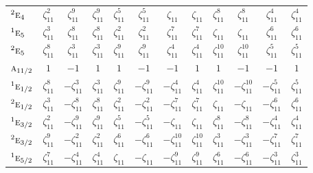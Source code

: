 \documentclass[10pt,a4paper]{article}
\makeatletter
\def\grouprule#1#2{\noalign{\marks\LTgroupmarks{\the\belowrulesep}\nobreak\vskip#1%
  \vskip\aboverulesep}\multispan\LT@cols\unskip{\leaders\hrule\@height#2\hfill\kern\z@}\cr
  \noalign{\penalty\LTrulebreak\vskip\belowrulesep\global\@lastruleclass\z@}}
\numberwithin{equation}{section}
\newcommand{\irr}[1]{\text{\normalfont\scshape #1}}
\newcommand{\conjpair}[1]{{}^{#1}}
\newcommand{\rootunity}[1]{\zeta_{#1}}
\makeatother
\begin{document}
{\begin{longtable}{@{}lccccccccccc@{}}
$\conjpair{2}\irr{e}_{4}$ & $\rootunity{11}^{2}$ & $\rootunity{11}^{9}$ & $\rootunity{11}^{9}$ & $\rootunity{11}^{5}$ & $\rootunity{11}^{5}$ & $\rootunity{11}$ & $\rootunity{11}$ & $\rootunity{11}^{8}$ & $\rootunity{11}^{8}$ & $\rootunity{11}^{4}$ & $\rootunity{11}^{4}$\\
$\conjpair{1}\irr{e}_{5}$ & $\rootunity{11}^{3}$ & $\rootunity{11}^{8}$ & $\rootunity{11}^{8}$ & $\rootunity{11}^{2}$ & $\rootunity{11}^{2}$ & $\rootunity{11}^{7}$ & $\rootunity{11}^{7}$ & $\rootunity{11}$ & $\rootunity{11}$ & $\rootunity{11}^{6}$ & $\rootunity{11}^{6}$\\
$\conjpair{2}\irr{e}_{5}$ & $\rootunity{11}^{8}$ & $\rootunity{11}^{3}$ & $\rootunity{11}^{3}$ & $\rootunity{11}^{9}$ & $\rootunity{11}^{9}$ & $\rootunity{11}^{4}$ & $\rootunity{11}^{4}$ & $\rootunity{11}^{10}$ & $\rootunity{11}^{10}$ & $\rootunity{11}^{5}$ & $\rootunity{11}^{5}$\\
\grouprule{0pt}{\lightrulewidth}
$\irr{a}_{11/2}$ & $1$ & $-1$ & $1$ & $1$ & $-1$ & $-1$ & $1$ & $1$ & $-1$ & $-1$ & $1$\\
$\conjpair{1}\irr{e}_{1/2}$ & $\rootunity{11}^{8}$ & $-\rootunity{11}^{3}$ & $\rootunity{11}^{3}$ & $\rootunity{11}^{9}$ & $-\rootunity{11}^{9}$ & $-\rootunity{11}^{4}$ & $\rootunity{11}^{4}$ & $\rootunity{11}^{10}$ & $-\rootunity{11}^{10}$ & $-\rootunity{11}^{5}$ & $\rootunity{11}^{5}$\\
$\conjpair{2}\irr{e}_{1/2}$ & $\rootunity{11}^{3}$ & $-\rootunity{11}^{8}$ & $\rootunity{11}^{8}$ & $\rootunity{11}^{2}$ & $-\rootunity{11}^{2}$ & $-\rootunity{11}^{7}$ & $\rootunity{11}^{7}$ & $\rootunity{11}$ & $-\rootunity{11}$ & $-\rootunity{11}^{6}$ & $\rootunity{11}^{6}$\\
$\conjpair{1}\irr{e}_{3/2}$ & $\rootunity{11}^{2}$ & $-\rootunity{11}^{9}$ & $\rootunity{11}^{9}$ & $\rootunity{11}^{5}$ & $-\rootunity{11}^{5}$ & $-\rootunity{11}$ & $\rootunity{11}$ & $\rootunity{11}^{8}$ & $-\rootunity{11}^{8}$ & $-\rootunity{11}^{4}$ & $\rootunity{11}^{4}$\\
$\conjpair{2}\irr{e}_{3/2}$ & $\rootunity{11}^{9}$ & $-\rootunity{11}^{2}$ & $\rootunity{11}^{2}$ & $\rootunity{11}^{6}$ & $-\rootunity{11}^{6}$ & $-\rootunity{11}^{10}$ & $\rootunity{11}^{10}$ & $\rootunity{11}^{3}$ & $-\rootunity{11}^{3}$ & $-\rootunity{11}^{7}$ & $\rootunity{11}^{7}$\\
$\conjpair{1}\irr{e}_{5/2}$ & $\rootunity{11}^{7}$ & $-\rootunity{11}^{4}$ & $\rootunity{11}^{4}$ & $\rootunity{11}$ & $-\rootunity{11}$ & $-\rootunity{11}^{9}$ & $\rootunity{11}^{9}$ & $\rootunity{11}^{6}$ & $-\rootunity{11}^{6}$ & $-\rootunity{11}^{3}$ & $\rootunity{11}^{3}$\\

\end{longtable}}
\end{document}
